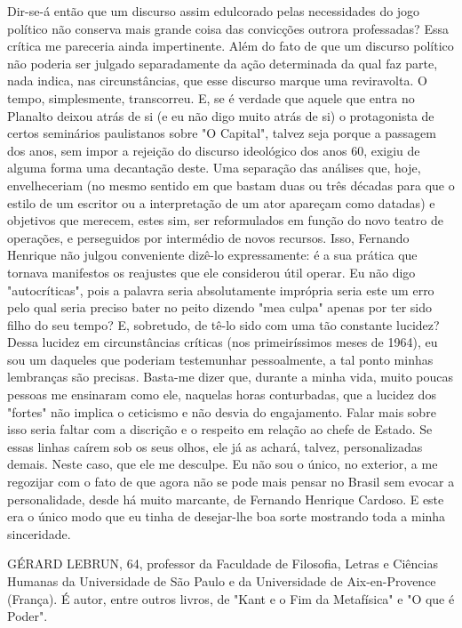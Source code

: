 Dir-se-á então que um discurso assim edulcorado pelas necessidades do jogo político não conserva mais grande coisa das convicções outrora professadas? Essa crítica me pareceria ainda impertinente. Além do fato de que um discurso político não poderia ser julgado separadamente da ação determinada da qual faz parte, nada indica, nas circunstâncias, que esse discurso marque uma reviravolta. O tempo, simplesmente, transcorreu. E, se é verdade que aquele que entra no Planalto deixou atrás de si (e eu não digo muito atrás de si) o protagonista de certos seminários paulistanos sobre "O Capital", talvez seja porque a passagem dos anos, sem impor a rejeição do discurso ideológico dos anos 60, exigiu de alguma forma uma decantação deste. Uma separação das análises que, hoje, envelheceriam (no mesmo sentido em que bastam duas ou três décadas para que o estilo de um escritor ou a interpretação de um ator apareçam como datadas) e objetivos que merecem, estes sim, ser reformulados em função do novo teatro de operações, e perseguidos por intermédio de novos recursos. Isso, Fernando Henrique não julgou conveniente dizê-lo expressamente: é a sua prática que tornava manifestos os reajustes que ele considerou útil operar. Eu não digo "autocríticas", pois a palavra seria absolutamente imprópria seria este um erro pelo qual seria preciso bater no peito dizendo "mea culpa" apenas por ter sido filho do seu tempo? E, sobretudo, de tê-lo sido com uma tão constante lucidez?
Dessa lucidez em circunstâncias críticas (nos primeiríssimos meses de 1964), eu sou um daqueles que poderiam testemunhar pessoalmente, a tal ponto minhas lembranças são precisas. Basta-me dizer que, durante a minha vida, muito poucas pessoas me ensinaram como ele, naquelas horas conturbadas, que a lucidez dos "fortes" não implica o ceticismo e não desvia do engajamento. Falar mais sobre isso seria faltar com a discrição e o respeito em relação ao chefe de Estado. Se essas linhas caírem sob os seus olhos, ele já as achará, talvez, personalizadas demais. Neste caso, que ele me desculpe. Eu não sou o único, no exterior, a me regozijar com o fato de que agora não se pode mais pensar no Brasil sem evocar a personalidade, desde há muito marcante, de Fernando Henrique Cardoso. E este era o único modo que eu tinha de desejar-lhe boa sorte mostrando toda a minha sinceridade.

GÉRARD LEBRUN, 64, professor da Faculdade de Filosofia, Letras e Ciências Humanas da Universidade de São Paulo e da Universidade de Aix-en-Provence (França). É autor, entre outros livros, de "Kant e o Fim da Metafísica" e "O que é Poder".

